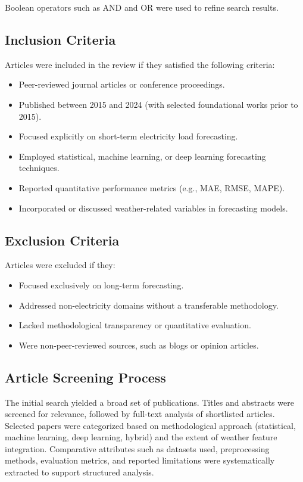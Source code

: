 \documentclass[conference]{IEEEtran}
\begin{document}
Boolean operators such as AND and OR were used to refine search results.

\subsection{Inclusion Criteria}

Articles were included in the review if they satisfied the following criteria:

\begin{itemize}
    \item Peer-reviewed journal articles or conference proceedings.
    \item Published between 2015 and 2024 (with selected foundational works prior to 2015).
    \item Focused explicitly on short-term electricity load forecasting.
    \item Employed statistical, machine learning, or deep learning forecasting techniques.
    \item Reported quantitative performance metrics (e.g., MAE, RMSE, MAPE).
    \item Incorporated or discussed weather-related variables in forecasting models.
\end{itemize}

\subsection{Exclusion Criteria}

Articles were excluded if they:

\begin{itemize}
    \item Focused exclusively on long-term forecasting.
    \item Addressed non-electricity domains without a transferable methodology.
    \item Lacked methodological transparency or quantitative evaluation.
    \item Were non-peer-reviewed sources, such as blogs or opinion articles.
\end{itemize}

\subsection{Article Screening Process}

The initial search yielded a broad set of publications. Titles and abstracts were screened for relevance, followed by full-text analysis of shortlisted articles. Selected papers were categorized based on methodological approach (statistical, machine learning, deep learning, hybrid) and the extent of weather feature integration. Comparative attributes such as datasets used, preprocessing methods, evaluation metrics, and reported limitations were systematically extracted to support structured analysis.
\end{document}
